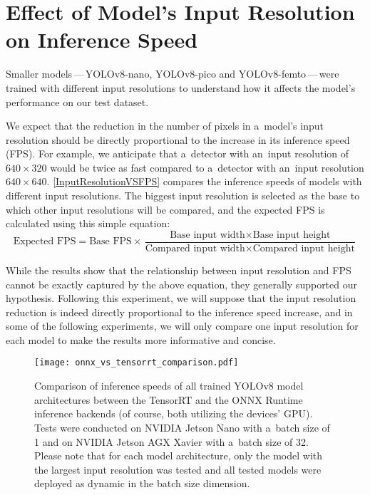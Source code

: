 \section{Effect of Model's Input Resolution on Inference Speed}
\label{InputResolutionVSFPSExperiment}

Smaller models\,---\,YOLOv8-nano, YOLOv8-pico and YOLOv8-femto\,---\,were
trained with different input resolutions to understand how it affects the
model's performance on our test dataset.

We expect that the reduction in the number of pixels in a~model's input
resolution should be directly proportional to the increase in its inference
speed (FPS). For example, we anticipate that a~detector with an~input resolution
of $640 \times 320$ would be twice as fast compared to a~detector with an~input
resolution $640 \times 640$. \autoref{InputResolutionVSFPS} compares the
inference speeds of models with different input resolutions. The biggest input
resolution is selected as the base to which other input resolutions will be
compared, and the expected FPS is calculated using this simple equation:
\begin{equation}
    \text{Expected FPS} = \text{Base FPS} \times \frac{\text{Base input width} \times \text{Base input height}}{\text{Compared input width} \times \text{Compared input height}}
\end{equation}

While the results show that the relationship between input resolution and
FPS cannot be exactly captured by the above equation, they generally
supported our hypothesis. Following this experiment, we will suppose that the
input resolution reduction is indeed directly proportional to the inference
speed increase, and in some of the following experiments, we will only compare
one input resolution for each model to make the results more informative and
concise.

\begin{figure}[H]
        \centering
        \texttt{[image: onnx\_vs\_tensorrt\_comparison.pdf]}
        \caption{Comparison of inference speeds of all trained YOLOv8 model
        architectures between the TensorRT and the ONNX Runtime inference
        backends (of course, both utilizing the devices' GPU). Tests were
        conducted on NVIDIA Jetson Nano with a~batch size of 1 and on NVIDIA
        Jetson AGX Xavier with a~batch size of 32. Please note that for each
        model architecture, only the model with the largest input resolution was
        tested and all tested models were deployed as dynamic in the batch size
        dimension.}
        \label{OrtVsTrtFPS}
\end{figure}


